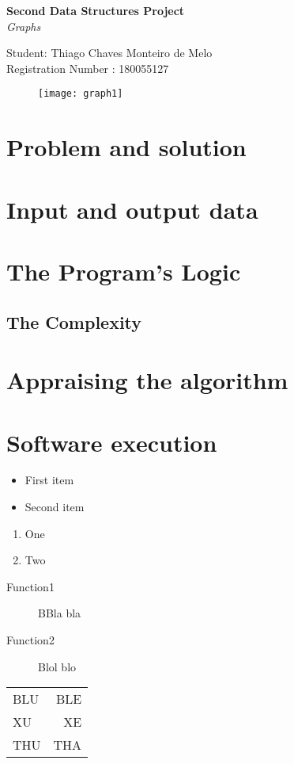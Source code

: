 \documentclass[titlepage]{article}
\begin{document}
    \begin{titlepage}
        \begin{center}
            {\bfseries\huge Second Data Structures Project}\\[0.5cm]
            {\LARGE\emph{Graphs}}\\[2cm]
        \end{center}
        \begin{flushleft}
            Student: Thiago Chaves Monteiro de Melo\\
            Registration Number : 180055127\\[3cm]
        \end{flushleft}

        \begin{figure}[h]
            \texttt{[image: graph1]}
        \end{figure}
          
    \end{titlepage}
    \section{Problem and solution}
    \section{Input and output data}
    \section{The Program's Logic}
        \subsection{The Complexity}
    \section{Appraising the algorithm}
    \section{Software execution}
    
    \begin{itemize}
        \item First item
        \item Second item
    \end{itemize}

    \begin{enumerate}
        \item One
        \item Two
    \end{enumerate}

    \begin{description}
        \item[Function1] BBla bla
        \item[Function2] Blol blo 
    \end{description}
    
    \begin{tabular}{lr}
        BLU & BLE\\
        XU & XE\\
        THU & THA\\
    \end{tabular}
\end{document}
